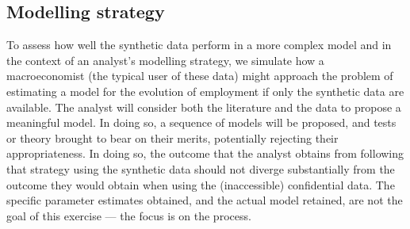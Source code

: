 










\subsection{Modelling strategy}

To assess how well the synthetic data perform in a more complex model and in the context of an analyst's modelling strategy, we simulate how a macroeconomist (the typical user of these data) might approach the problem of estimating a model for the evolution of employment if only the synthetic data are available. The analyst will consider both the literature and the data to propose a meaningful model. In doing so, a sequence of models will be proposed, and tests or theory brought to bear on their merits, potentially rejecting their appropriateness. In doing so, the outcome that the analyst obtains from following that strategy using the synthetic data should not diverge substantially from the outcome they would obtain when using the (inaccessible) confidential data. The specific parameter estimates obtained, and the actual model retained, are not the goal of this exercise --- the focus is on the process.

